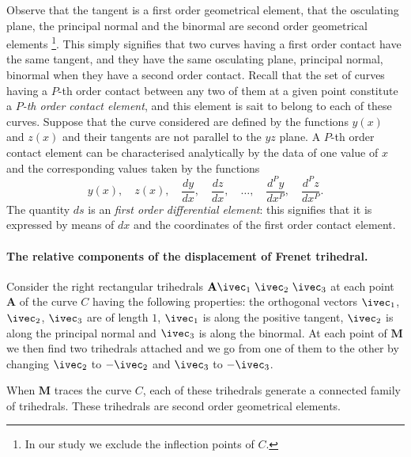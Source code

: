 Observe that the tangent is a first order geometrical element, that the osculating plane, the principal normal and the binormal are second order geometrical elements \footnote{In our study we exclude the inflection points of $C$.}. This simply signifies that two curves having a first order contact have the same tangent, and they have the same osculating plane, principal normal, binormal when they have a second order contact. Recall that the set of curves having a $P$-th order contact between any two of them at a given point constitute a \emph{$P$-th order contact element}, and this element is sait to belong to each of these curves. Suppose that the curve considered are defined by the functions $y(x)$ and $z(x)$ and their tangents are not parallel to the $yz$ plane. A $P$-th order contact element can be characterised analytically by the data of one value of $x$ and the corresponding values taken by the functions
\[
y(x),\quad z(x),\quad \frac{dy}{dx},\quad \frac{dz}{dx},\quad\dots,\quad\frac{d^{P}y}{dx^{P}},\quad \frac{d^{P}z}{dx^{P}}.
\]
The quantity $ds$ is an \emph{first order differential element}: this signifies that it is expressed by means of $dx$ and the coordinates of the first order contact element.

\paragraph{The relative components of the displacement of Frenet trihedral.}
\label{sec:10}
Consider the right rectangular trihedrals $\mathbf{A}\ivec_{1}\ \ivec_{2}\ \ivec_{3}$ at each point $\mathbf{A}$ of the curve $C$ having the following properties: the orthogonal vectors $\ivec_{1}$, $\ivec_{2}$, $\ivec_{3}$ are of length $1$, $\ivec_{1}$ is along the positive tangent, $\ivec_{2}$ is along the principal normal and $\ivec_{3}$ is along the binormal. At each point of $\mathbf{M}$ we then find two trihedrals attached and we go from one of them to the other by changing $\ivec_{2}$ to $-\ivec_{2}$ and $\ivec_{3}$ to $-\ivec_{3}$.

When $\mathbf{M}$ traces the curve $C$, each of these trihedrals generate a connected family of trihedrals. These trihedrals are second order geometrical elements.


